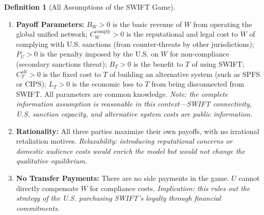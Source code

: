 \documentclass[12pt,a4paper]{ctexart}
\theoremstyle{definition}
\newtheorem{definition}{Definition}[section]
\theoremstyle{remark}
\begin{document}
\begin{definition}[All Assumptions of the SWIFT Game]
\label{def:swift-assumptions}
\begin{enumerate}[label=\textbf{S\arabic*}, leftmargin=*, itemsep=4pt]
\item \textbf{Payoff Parameters:} $B_W > 0$ is the basic revenue of $W$ from operating the global unified network; $C_W^{\text{comply}} > 0$ is the reputational and legal cost to $W$ of complying with U.S. sanctions (from counter-threats by other jurisdictions); $P_U > 0$ is the penalty imposed by the U.S. on $W$ for non-compliance (secondary sanctions threat); $B_T > 0$ is the benefit to $T$ of using SWIFT; $C_T^{\text{alt}} > 0$ is the fixed cost to $T$ of building an alternative system (such as SPFS or CIPS); $L_T > 0$ is the economic loss to $T$ from being disconnected from SWIFT. All parameters are common knowledge. \hfill\textit{Note: the complete information assumption is reasonable in this context---SWIFT connectivity, U.S. sanction capacity, and alternative system costs are public information.}
\item \textbf{Rationality:} All three parties maximize their own payoffs, with no irrational retaliation motives. \hfill\textit{Relaxability: introducing reputational concerns or domestic audience costs would enrich the model but would not change the qualitative equilibrium.}
\item \textbf{No Transfer Payments:} There are no side payments in the game. $U$ cannot directly compensate $W$ for compliance costs. \hfill\textit{Implication: this rules out the strategy of the U.S. purchasing SWIFT's loyalty through financial commitments.}
\end{enumerate}
\end{definition}
\end{document}
